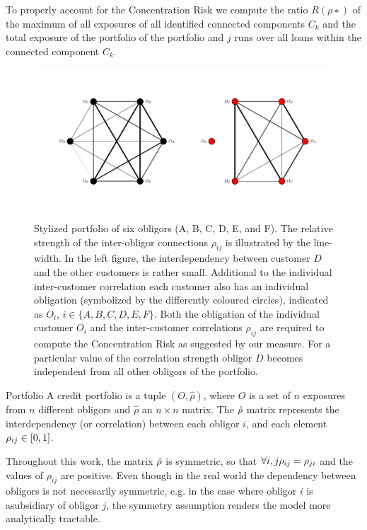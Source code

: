 To properly account for the Concentration Risk we compute the ratio $R(ρ∗)$ of the maximum of all exposures of all identified connected components $C_k$ and the total exposure of the portfolio
of the portfolio and $j$ runs over all loans within the connected component $C_k$.
\begin{figure}[tb]
	\centering
	\includegraphics[scale=0.5]{figures/ramping_parameter_example.png}
	\caption{
Stylized portfolio of six obligors (A, B, C, D, E, and F).
The relative strength of the inter-obligor connections $\rho_{ij}$ is illustrated by the line-width.
In the left figure, the interdependency between customer $D$ and the other customers is rather small.
Additional to the individual inter-customer correlation each customer also has an individual obligation (symbolized by the differently coloured circles), indicated as $O_i$, $i \in \{A, B, C, D, E, F \}$.
Both the obligation of the individual customer $O_i$ and the inter-customer correlations $\rho_{ij}$ are required to compute the Concentration Risk as suggested by our measure.
For a particular value of the correlation strength obligor $D$ becomes independent from all other obligors of the portfolio.
	}
	\label{fig:6_pf_ramping}
\end{figure}

 
 
 
\begin{definition}{Portfolio}
A credit portfolio is a tuple $(O, \hat{\rho})$, where $O$ is a set of $n$ exposures from $n$ different obligors and $\hat{\rho}$ an $n \times n$ matrix.
The $\hat{\rho}$ matrix represents the interdependency (or correlation) between each obligor $i$, and each element $\rho_{ij} \in [0,1]$.
\end{definition}

\begin{remark}
Throughout this work, the matrix $\hat{\rho}$ is symmetric, so that $\forall i,j \rho_{ij} = \rho_{ji}$ and the values of $\rho_{ij}$ are positive.
Even though in the real world the dependency between obligors is not necessarily symmetric, e.g. in the case where obligor $i$ is asubsidiary of obligor $j$, the symmetry assumption renders the model more analytically tractable.
\end{remark}





